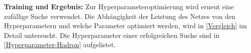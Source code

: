 \textbf{Training und Ergebnis:} Zur Hyperparameteroptimierung wird erneut eine zufällige Suche verwendet. Die Abhängigkeit der Leistung des Netzes von den Hyperparametern und welche Parameter optimiert werden, wird in \textsf{\autoref{Vergleich}} im Detail untersucht. Die Hyperparameter einer erfolgreichen Suche sind in \textsf{\autoref{Hyperparameter-Hadron}} aufgelistet. 
\begin{figure}[tbp] %
	\centering
	\captionsetup{justification=justified}
	 \\

\end{figure}
